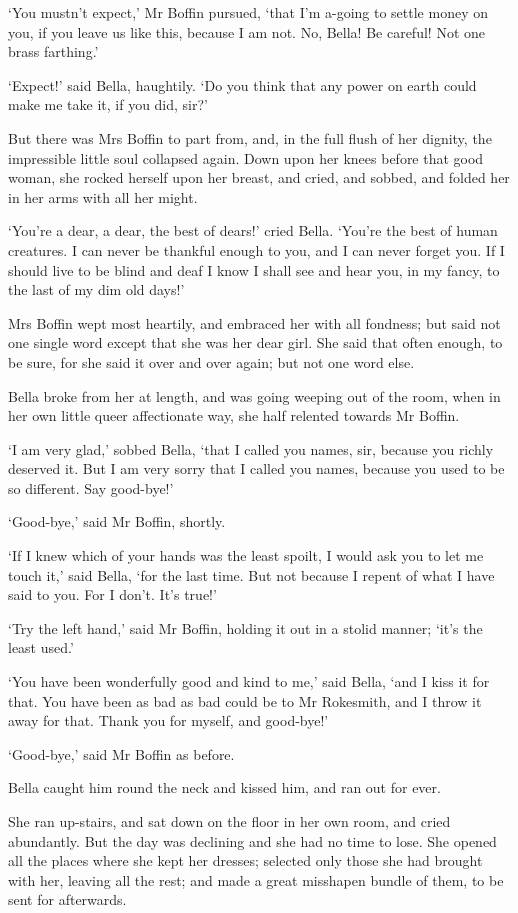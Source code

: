 ‘You mustn’t expect,’ Mr Boffin pursued, ‘that I’m a-going to settle
money on you, if you leave us like this, because I am not. No, Bella! Be
careful! Not one brass farthing.’

‘Expect!’ said Bella, haughtily. ‘Do you think that any power on earth
could make me take it, if you did, sir?’

But there was Mrs Boffin to part from, and, in the full flush of her
dignity, the impressible little soul collapsed again. Down upon her
knees before that good woman, she rocked herself upon her breast, and
cried, and sobbed, and folded her in her arms with all her might.

‘You’re a dear, a dear, the best of dears!’ cried Bella. ‘You’re the
best of human creatures. I can never be thankful enough to you, and I
can never forget you. If I should live to be blind and deaf I know I
shall see and hear you, in my fancy, to the last of my dim old days!’

Mrs Boffin wept most heartily, and embraced her with all fondness; but
said not one single word except that she was her dear girl. She said
that often enough, to be sure, for she said it over and over again; but
not one word else.

Bella broke from her at length, and was going weeping out of the room,
when in her own little queer affectionate way, she half relented towards
Mr Boffin.

‘I am very glad,’ sobbed Bella, ‘that I called you names, sir, because
you richly deserved it. But I am very sorry that I called you names,
because you used to be so different. Say good-bye!’

‘Good-bye,’ said Mr Boffin, shortly.

‘If I knew which of your hands was the least spoilt, I would ask you
to let me touch it,’ said Bella, ‘for the last time. But not because I
repent of what I have said to you. For I don’t. It’s true!’

‘Try the left hand,’ said Mr Boffin, holding it out in a stolid manner;
‘it’s the least used.’

‘You have been wonderfully good and kind to me,’ said Bella, ‘and I kiss
it for that. You have been as bad as bad could be to Mr Rokesmith, and I
throw it away for that. Thank you for myself, and good-bye!’

‘Good-bye,’ said Mr Boffin as before.

Bella caught him round the neck and kissed him, and ran out for ever.

She ran up-stairs, and sat down on the floor in her own room, and cried
abundantly. But the day was declining and she had no time to lose. She
opened all the places where she kept her dresses; selected only those
she had brought with her, leaving all the rest; and made a great
misshapen bundle of them, to be sent for afterwards.

